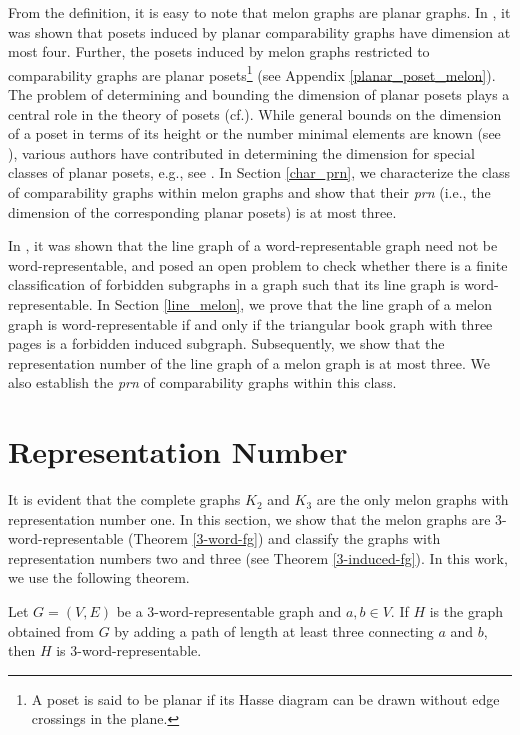 \documentclass{llncs}
\begin{document}
From the definition, it is easy to note that melon graphs are planar graphs. In \cite{Felsner_2015}, it was shown that posets induced by planar  comparability graphs have dimension at most four. Further, the posets induced by melon graphs restricted to comparability graphs are planar posets\footnote{A poset is said to be	planar if its Hasse diagram  can be drawn without edge crossings in the plane.} (see Appendix \ref{planar_poset_melon}). The problem of determining and bounding the dimension of planar posets plays a central role in the theory of posets  (cf.\cite{trotterbook}). While general bounds on the dimension of a poset in terms of its height or the number minimal elements are known (see \cite{Joret_2017,Trotter_2016}), various authors have contributed in  determining the dimension for special classes of planar posets, e.g., see \cite{biro_2021,trotter_dim}. In Section \ref{char_prn}, we characterize the class of comparability graphs within melon graphs and show that their \textit{prn} (i.e., the dimension of the corresponding planar posets) is at most three. 



In \cite{kitaev_linegraphs}, it was shown that the line graph of a word-representable graph need not be word-representable, and posed an open problem to check whether there is a finite classification of forbidden subgraphs in a graph such that its line graph is word-representable. In Section \ref{line_melon}, we prove that the line graph of a melon graph is word-representable if and only if the triangular book graph with three pages is a forbidden induced subgraph. Subsequently, we show that the representation number of the line graph of a melon graph is at most three. We also establish the \textit{prn} of comparability graphs within this class.



\section{Representation Number}
\label{rno_melon}

It is evident that the complete graphs $K_2$ and $K_3$ are the only melon graphs with representation number one.  In this section, we show that the melon graphs are 3-word-representable (Theorem \ref{3-word-fg}) and classify the graphs with representation numbers two and three (see Theorem \ref{3-induced-fg}). 
In this work, we use the following theorem.

\begin{theorem} \label{subdiv}
	Let $G =(V,E)$ be a $3$-word-representable graph and $a, b \in V$. If $H$ is the graph obtained from $G$ by adding a path of length at least three connecting $a$ and $b$, then $H$ is $3$-word-representable. 
\end{theorem}
\end{document}
